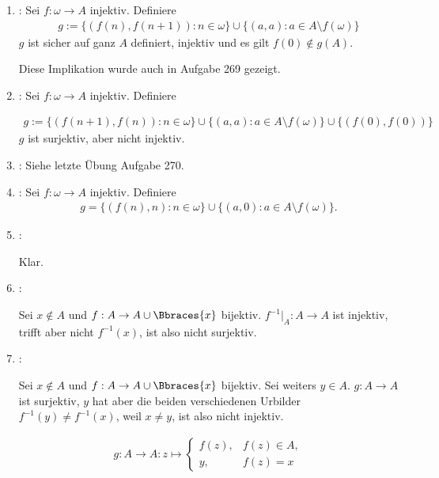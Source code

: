 \begin{solution}
\begin{enumerate}[label = \texttt{ad}]
\begin{enumerate}[label = \arabic*.]
  \end{enumerate}

  \item {}: Sei $f: \omega \to A$ injektiv.
  Definiere
  \begin{align*}
    g := \{(f(n),f(n+1)): n \in \omega\} \cup \{(a,a): a \in A \setminus f(\omega)\}
  \end{align*}
  $g$ ist sicher auf ganz $A$ definiert, injektiv und es gilt $f(0) \notin g(A)$.
  
  Diese Implikation wurde auch in Aufgabe 269 gezeigt.

  \item {}: Sei $f: \omega \to A$ injektiv. Definiere

  \begin{align*}
    g := \{(f(n+1),f(n)): n \in \omega\} \cup \{(a,a): a \in A \setminus f(\omega)\}
    \cup \{(f(0),f(0))\}
  \end{align*}
  $g$ ist surjektiv, aber nicht injektiv.

  \item {}: Siehe letzte Übung Aufgabe 270.

  \item {}: Sei $f: \omega \to A$ injektiv. Definiere
  \begin{align*}
    g = \{(f(n), n): n \in \omega\} \cup \{(a,0): a \in A \setminus f(\omega)\}.
  \end{align*}

  \item {}:

  Klar.

  \item {}:

  Sei $x \not \in A$ und $f: A \to A \cup \Bbraces{x}$ bijektiv.
  $f^{-1} |_A: A \to A$ ist injektiv, trifft aber nicht $f^{-1}(x)$, ist also nicht surjektiv.

  \item {}:

  Sei $x \not \in A$ und $f: A \to A \cup \Bbraces{x}$ bijektiv.
  Sei weiters $y \in A$.
  $g: A \to A$ ist surjektiv, $y$ hat aber die beiden verschiedenen Urbilder $f^{-1}(y) \neq f^{-1}(x)$, weil $x \neq y$, ist also nicht injektiv.

  \begin{align*}
    g:
    A \to A:
    z
    \mapsto
    \begin{cases}
      f(z), & f(z) \in A, \\
      y,    & f(z) = x
    \end{cases}
  \end{align*}


\end{enumerate}
\end{solution}

